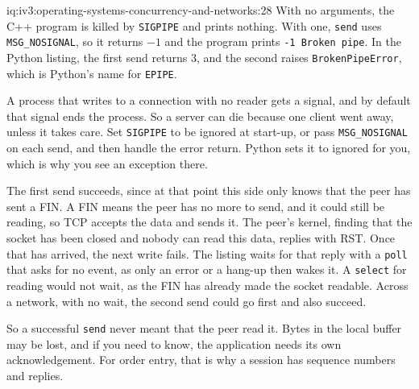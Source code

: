 \begin{solution}{iq:iv3:operating-systems-concurrency-and-networks:28}
With no arguments, the C++ program is killed by \texttt{SIGPIPE} and prints nothing. With one, \texttt{send} uses \texttt{MSG\_NOSIGNAL}, so it returns $-1$ and the program prints \texttt{-1 Broken pipe}. In the Python listing, the first send returns 3, and the second raises \texttt{BrokenPipeError}, which is Python's name for \texttt{EPIPE}.

A process that writes to a connection with no reader gets a signal, and by default that signal ends the process. So a server can die because one client went away, unless it takes care. Set \texttt{SIGPIPE} to be ignored at start-up, or pass \texttt{MSG\_NOSIGNAL} on each send, and then handle the error return. Python sets it to ignored for you, which is why you see an exception there.

The first send succeeds, since at that point this side only knows that the peer has sent a FIN. A FIN means the peer has no more to send, and it could still be reading, so TCP accepts the data and sends it. The peer's kernel, finding that the socket has been closed and nobody can read this data, replies with RST. Once that has arrived, the next write fails. The listing waits for that reply with a \texttt{poll} that asks for no event, as only an error or a hang-up then wakes it. A \texttt{select} for reading would not wait, as the FIN has already made the socket readable. Across a network, with no wait, the second send could go first and also succeed.

So a successful \texttt{send} never meant that the peer read it. Bytes in the local buffer may be lost, and if you need to know, the application needs its own acknowledgement. For order entry, that is why a session has sequence numbers and replies.

\end{solution}

